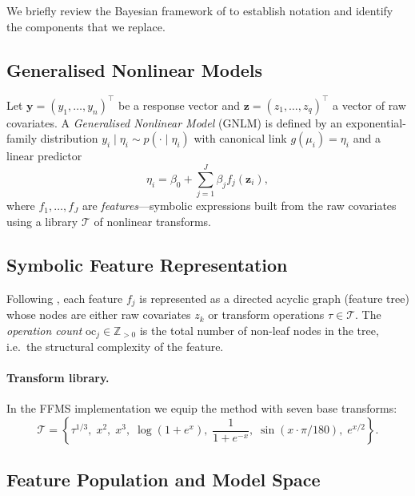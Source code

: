 \documentclass[12pt,a4paper]{article}
\newcommand{\oc}{\mathrm{oc}}
\newcommand{\by}{\mathbf{y}}
\begin{document}
We briefly review the Bayesian framework of \citet{Hubin2021JAIR} to establish
notation and identify the components that we replace.

\subsection{Generalised Nonlinear Models}

Let $\by = (y_1,\ldots,y_n)^\top$ be a response vector and
$\mathbf{z} = (z_1,\ldots,z_q)^\top$ a vector of raw covariates.
A \emph{Generalised Nonlinear Model} (GNLM) is defined by an exponential-family
distribution $y_i \mid \eta_i \sim p(\cdot \mid \eta_i)$ with canonical link
$g(\mu_i) = \eta_i$ and a linear predictor
\begin{equation}
  \eta_i = \beta_0 + \sum_{j=1}^{J} \beta_j f_j(\mathbf{z}_i),
  \label{eq:gnlm}
\end{equation}
where $f_1,\ldots,f_J$ are \emph{features}---symbolic expressions built from
the raw covariates using a library $\mathcal{T}$ of nonlinear transforms.

\subsection{Symbolic Feature Representation}

Following \citet{Hubin2021JAIR}, each feature $f_j$ is represented as a
directed acyclic graph (feature tree) whose nodes are either raw covariates
$z_k$ or transform operations $\tau \in \mathcal{T}$.  The
\emph{operation count} $\oc_j \in \mathbb{Z}_{>0}$ is the total number of
non-leaf nodes in the tree, i.e.\ the structural complexity of the feature.

\paragraph{Transform library.}
In the FFMS implementation we equip the method with seven base transforms:
\begin{equation}
  \mathcal{T} = \left\{
    \tau^{1/3},\; x^2,\; x^3,\; \log(1+e^x),\; \frac{1}{1+e^{-x}},\;
    \sin(x \cdot \pi/180),\; e^{x/2}
  \right\}.
  \label{eq:transforms}
\end{equation}

\subsection{Feature Population and Model Space}
\end{document}
